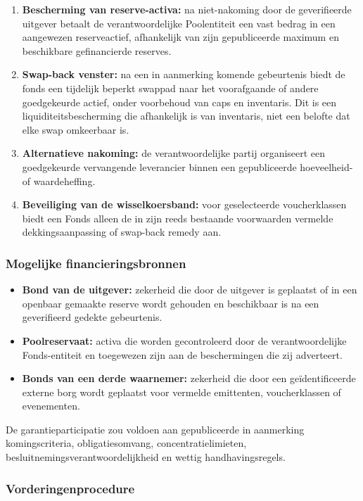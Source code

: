 \documentclass[11pt]{article}
\begin{document}
\begin{enumerate}[leftmargin=*]
\item \textbf{Bescherming van reserve-activa:} na niet-nakoming door de geverifieerde uitgever betaalt de verantwoordelijke Poolentiteit een vast bedrag in een aangewezen reserveactief, afhankelijk van zijn gepubliceerde maximum en beschikbare gefinancierde reserves.
\item \textbf{Swap-back venster:} na een in aanmerking komende gebeurtenis biedt de fonds een tijdelijk beperkt swappad naar het voorafgaande of andere goedgekeurde actief, onder voorbehoud van caps en inventaris. Dit is een liquiditeitsbescherming die afhankelijk is van inventaris, niet een belofte dat elke swap omkeerbaar is.
\item \textbf{Alternatieve nakoming:} de verantwoordelijke partij organiseert een goedgekeurde vervangende leverancier binnen een gepubliceerde hoeveelheid- of waardeheffing.
\item \textbf{Beveiliging van de wisselkoersband:} voor geselecteerde voucherklassen biedt een Fonds alleen de in zijn reeds bestaande voorwaarden vermelde dekkingsaanpassing of swap-back remedy aan.
\end{enumerate}
\subsubsection*{Mogelijke financieringsbronnen}

\begin{itemize}[leftmargin=*]
\item \textbf{Bond van de uitgever:} zekerheid die door de uitgever is geplaatst of in een openbaar gemaakte reserve wordt gehouden en beschikbaar is na een geverifieerd gedekte gebeurtenis.
\item \textbf{Poolreservaat:} activa die worden gecontroleerd door de verantwoordelijke Fonds-entiteit en toegewezen zijn aan de beschermingen die zij adverteert.
\item \textbf{Bonds van een derde waarnemer:} zekerheid die door een geïdentificeerde externe borg wordt geplaatst voor vermelde emittenten, voucherklassen of evenementen.
\end{itemize}
De garantieparticipatie zou voldoen aan gepubliceerde in aanmerking komingscriteria, obligatiesomvang, concentratielimieten, besluitnemingsverantwoordelijkheid en wettig handhavingsregels.

\subsubsection*{Vorderingenprocedure}
\end{document}
